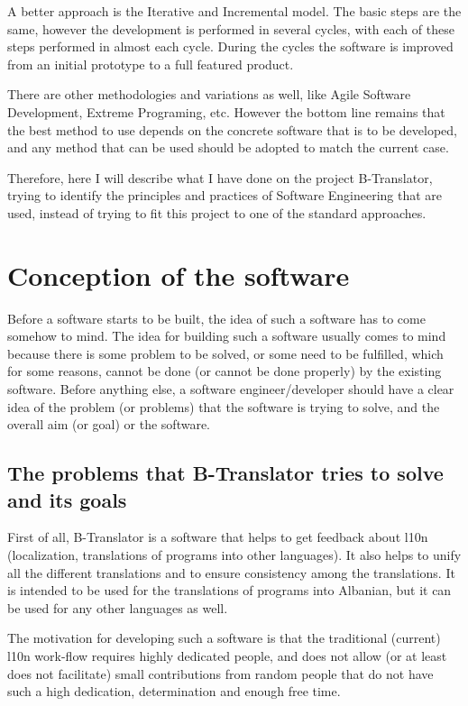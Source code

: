 \documentclass[11pt]{article}
\begin{document}
  A better approach is the Iterative and Incremental model. The basic
  steps are the same, however the development is performed in several
  cycles, with each of these steps performed in almost each
  cycle. During the cycles the software is improved from an initial
  prototype to a full featured product.

  There are other methodologies and variations as well, like Agile
  Software Development, Extreme Programing, etc. However the bottom
  line remains that the best method to use depends on the concrete
  software that is to be developed, and any method that can be used
  should be adopted to match the current case.

  Therefore, here I will describe what I have done on the project
  B-Translator, trying to identify the principles and practices of
  Software Engineering that are used, instead of trying to fit this
  project to one of the standard approaches.


\section{Conception of the software}
\label{sec-2}


  Before a software starts to be built, the idea of such a software
  has to come somehow to mind. The idea for building such a software
  usually comes to mind because there is some problem to be solved, or
  some need to be fulfilled, which for some reasons, cannot be done
  (or cannot be done properly) by the existing software. Before
  anything else, a software engineer/developer should have a clear
  idea of the problem (or problems) that the software is trying to
  solve, and the overall aim (or goal) or the software.

\subsection{The problems that B-Translator tries to solve and its goals}
\label{sec-2.1}


   First of all, B-Translator is a software that helps to get feedback
   about l10n (localization, translations of programs into other
   languages). It also helps to unify all the different translations
   and to ensure consistency among the translations. It is intended to
   be used for the translations of programs into Albanian, but it can
   be used for any other languages as well.

   The motivation for developing such a software is that the
   traditional (current) l10n work-flow requires highly dedicated
   people, and does not allow (or at least does not facilitate) small
   contributions from random people that do not have such a high
   dedication, determination and enough free time.
\end{document}
